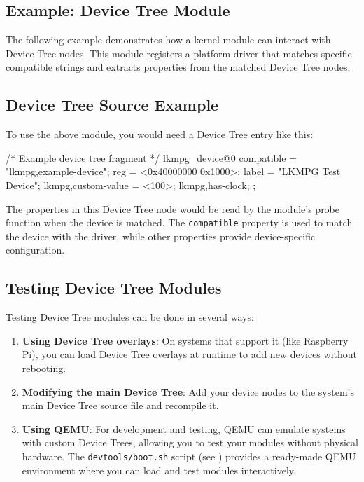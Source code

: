 \documentclass[10pt, oneside]{book}
\begin{document}
\subsection{Example: Device Tree Module}
\label{sec:dt_example}
The following example demonstrates how a kernel module can interact with Device Tree nodes.
This module registers a platform driver that matches specific compatible strings and extracts properties from the matched Device Tree nodes.


\subsection{Device Tree Source Example}
\label{sec:dt_source}
To use the above module, you would need a Device Tree entry like this:

\begin{code}
/* Example device tree fragment */
lkmpg_device@0 {
    compatible = "lkmpg,example-device";
    reg = <0x40000000 0x1000>;
    label = "LKMPG Test Device";
    lkmpg,custom-value = <100>;
    lkmpg,has-clock;
};
\end{code}

The properties in this Device Tree node would be read by the module's probe function when the device is matched.
The \verb|compatible| property is used to match the device with the driver, while other properties provide device-specific configuration.

\subsection{Testing Device Tree Modules}
\label{sec:dt_testing}
Testing Device Tree modules can be done in several ways:

\begin{enumerate}
  \item \textbf{Using Device Tree overlays}: On systems that support it (like Raspberry Pi), you can load Device Tree overlays at runtime to add new devices without rebooting.

  \item \textbf{Modifying the main Device Tree}: Add your device nodes to the system's main Device Tree source file and recompile it.

  \item \textbf{Using QEMU}: For development and testing, QEMU can emulate systems with custom Device Trees, allowing you to test your modules without physical hardware.
        The \verb|devtools/boot.sh| script (see ) provides a ready-made QEMU environment where you can load and test modules interactively.
\end{enumerate}
\end{document}
